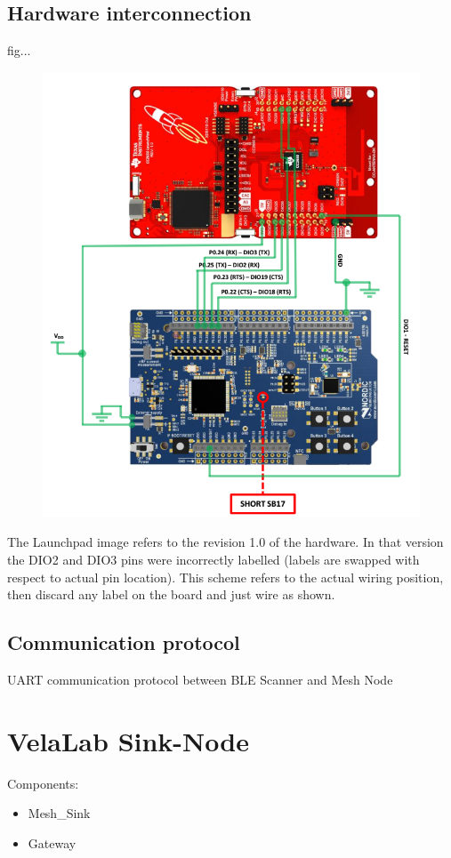 \documentclass[12pt]{article}
\begin{document}
\subsection{Hardware interconnection}

fig...

\begin{figure}[!h]
	\centering
	\includegraphics[width=0.7\columnwidth]{fig/VelaNode_hw.png}
	\caption{}
	\label{fig:system}
\end{figure}

The Launchpad image refers to the revision 1.0 of the hardware. In that version the DIO2 and DIO3 pins were incorrectly labelled (labels are swapped with respect to actual pin location). This scheme refers to the actual wiring position, then discard any label on the board and just wire as shown.


\subsection{Communication protocol}

UART communication protocol between BLE Scanner and Mesh Node


\section{VelaLab Sink-Node}

Components:
\begin{itemize}
\item{Mesh\_Sink}
\item{Gateway}
\end{itemize}
\end{document}
